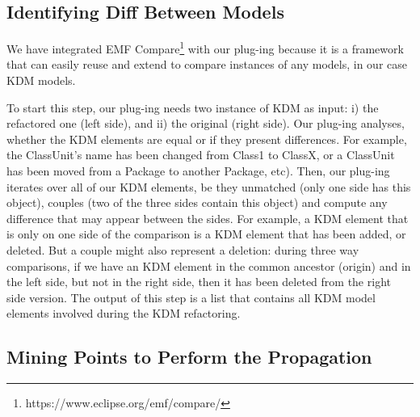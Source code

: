 
\subsection{Identifying Diff Between Models}


We have integrated  EMF Compare\footnote{https://www.eclipse.org/emf/compare/} with our plug-ing because it is a framework that can easily reuse and extend to compare instances of any models, in our case KDM models. %

To start this step, our plug-ing needs two instance of KDM as input: i) the refactored one (left side), and ii) the original (right side). Our plug-ing analyses, whether the KDM elements are equal or if they present differences. For example, the ClassUnit's name has been changed from Class1 to ClassX, or a ClassUnit has been moved from a Package to another Package, etc). Then, our plug-ing iterates over all of our KDM elements, be they unmatched (only one side has this object), couples (two of the three sides contain this object) and compute any difference that may appear between the sides. 
For example, a KDM element that is only on one side of the comparison is a KDM element that has been added, or deleted. But a couple might also represent a deletion: during three way comparisons, if we have an KDM element in the common ancestor (origin) and in the left side, but not in the right side, then it has been deleted from the right side version. The output of this step is a list that contains all KDM model elements involved during the KDM refactoring. 

\subsection{Mining Points to Perform the Propagation} %
\label{sub:mine_affected_metaclasses}


